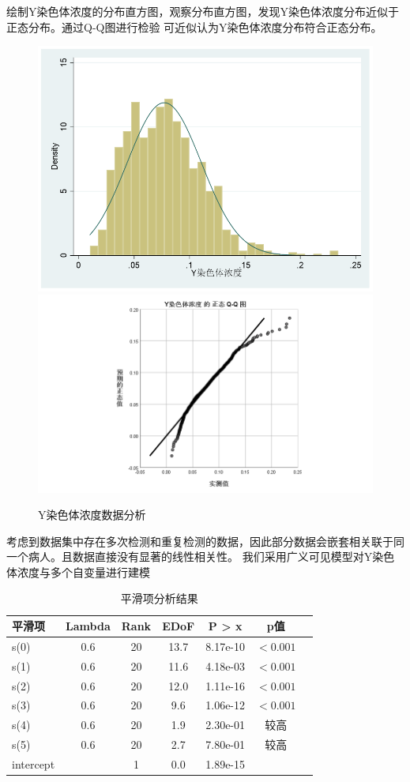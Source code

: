 \documentclass[withoutpreface,notoc]{cumcmthesis}
\begin{document}
	绘制Y染色体浓度的分布直方图，观察分布直方图，发现Y染色体浓度分布近似于正态分布。通过Q-Q图进行检验
	可近似认为Y染色体浓度分布符合正态分布。
	\begin{figure}[ht]
		\centering
		{\includegraphics[width=.45\textwidth]{figures/Y染色体浓度分布.png}}
		\hfill %
		{\includegraphics[width=.45\textwidth]{figures/Y染色体浓度正态.png}}
		\caption{Y染色体浓度数据分析}
		\label{fig:Y染色体浓度}
	\end{figure}






	考虑到数据集中存在多次检测和重复检测的数据，因此部分数据会嵌套相关联于同一个病人。且数据直接没有显著的线性相关性。
	我们采用广义可见模型对Y染色体浓度与多个自变量进行建模



	\begin{table}[H]
	\centering
	\caption{平滑项分析结果}
	\label{tab:smooth_terms}
		\begin{tabular}{lcccccc}
		\toprule
		平滑项 & Lambda & Rank & EDoF & P > x & p值 \\
		\midrule
		s(0) & 0.6 & 20 & 13.7 & 8.17e-10 & $<0.001$ \\
		s(1) & 0.6 & 20 & 11.6 & 4.18e-03 & $<0.001$ \\
		s(2) & 0.6 & 20 & 12.0 & 1.11e-16 & $<0.001$ \\
		s(3) & 0.6 & 20 & 9.6 & 1.06e-12 & $<0.001$ \\
		s(4) & 0.6 & 20 & 1.9 & 2.30e-01 & 较高 \\
		s(5) & 0.6 & 20 & 2.7 & 7.80e-01 & 较高 \\
		intercept & & 1 & 0.0 & 1.89e-15 &      \\
		\bottomrule
		\end{tabular}
	\end{table}
\end{document}
